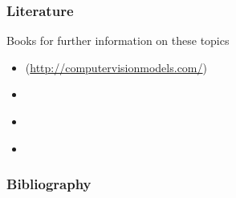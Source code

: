 \documentclass[xetex,professionalfont]{beamer}
\begin{document}
\begin{frame}
\frametitle{Literature}

Books for further information on these topics
\begin{itemize}
    \item \cite{prince12} (\url{http://computervisionmodels.com/})
    \item \cite{bishop2006}
    \item \cite{boyd2009}
    \item \cite{wright1999}
\end{itemize}

\end{frame}


\begin{frame}
\frametitle{Bibliography}

\printbibliography

\end{frame}
\end{document}
